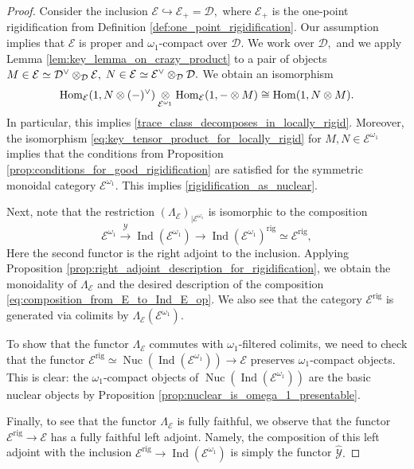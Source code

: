 \documentclass[11pt,leqno]{amsart}
\numberwithin{equation}{section}
\def\Hom{\operatorname{Hom}}
\newcommand{\tens}[1]{%
  \mathbin{\mathop{\otimes}\displaylimits_{#1}}%
}
\newcommand{\xto}{\xrightarrow}
\newcommand{\hto}{\hookrightarrow}
\newcommand{\rig}{\operatorname{rig}}
\newcommand{\Nuc}{\operatorname{Nuc}}
\newcommand{\cD}{{\mathcal D}}
\newcommand{\cE}{{\mathcal E}}
\newcommand{\cY}{{\mathcal Y}}
\newcommand{\Ind}{\operatorname{Ind}}
\begin{document}
\begin{proof} Consider the inclusion $\cE\hto\cE_+=\cD,$ where $\cE_+$ is the one-point rigidification from Definition \ref{def:one_point_rigidification}. Our assumption implies that $\cE$ is proper and $\omega_1$-compact over $\cD.$ We work over $\cD,$ and we apply Lemma \ref{lem:key_lemma_on_crazy_product} to a pair of objects $M\in\cE\simeq \cD^{\vee}\tens{\cD}\cE,$ $N\in \cE\simeq\cE^{\vee}\tens{\cD}\cD.$ We obtain an isomorphism
\begin{equation}\label{eq:key_tensor_product_for_locally_rigid}
\Hom_{\cE}(1,N\otimes(-)^{\vee})\tens{\cE^{\omega_1}}\Hom_{\cE}(1,-\otimes M)\cong \Hom(1,N\otimes M).
\end{equation}
In particular, this implies \ref{trace_class_decomposes_in_locally_rigid}. Moreover, the isomorphism \eqref{eq:key_tensor_product_for_locally_rigid} for $M,N\in\cE^{\omega_1}$ implies that the conditions from Proposition \ref{prop:conditions_for_good_rigidification} are satisfied for the symmetric monoidal category $\cE^{\omega_1}.$ This implies \ref{rigidification_as_nuclear}.

Next, note that the restriction $(\Lambda_{\cE})_{\mid \cE^{\omega_1}}$ is isomorphic to the composition
\begin{equation*}
	\cE^{\omega_1}\xto{\cY}\Ind(\cE^{\omega_1})\to \Ind(\cE^{\omega_1})^{\rig}\simeq\cE^{\rig},
\end{equation*}
Here the second functor is the right adjoint to the inclusion. Applying Proposition \ref{prop:right_adjoint_description_for_rigidification}, we obtain the monoidality of $\Lambda_{\cE}$ and the desired description of the composition \eqref{eq:composition_from_E_to_Ind_E_op}. We also see that the category $\cE^{\rig}$ is generated via colimits by $\Lambda_{\cE}(\cE^{\omega_1}).$

To show that the functor $\Lambda_{\cE}$ commutes with $\omega_1$-filtered colimits, we need to check that the functor $\cE^{\rig}\simeq\Nuc(\Ind(\cE^{\omega_1}))\to 
\cE$ preserves $\omega_1$-compact objects. This is clear: the $\omega_1$-compact objects of $\Nuc(\Ind(\cE^{\omega_1}))$ are the basic nuclear objects by Proposition \ref{prop:nuclear_is_omega_1_presentable}. 

Finally, to see that the functor $\Lambda_{\cE}$ is fully faithful, we observe that the functor $\cE^{\rig}\to\cE$ has a fully faithful left adjoint. Namely, the composition of this left adjoint with the inclusion $\cE^{\rig}\to\Ind(\cE^{\omega_1})$ is simply the functor $\hat{\cY}.$
\end{proof}
	
\end{document}

